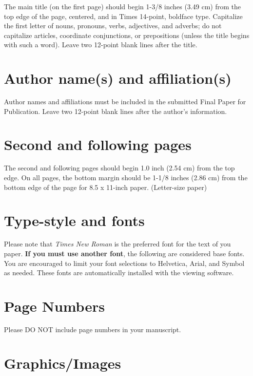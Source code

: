 \documentclass[10pt]{article}
\begin{document}
The main title (on the first page) should begin 1-3/8 inches (3.49 cm) from the top edge of the page, centered, and in Times 14-point, boldface type. Capitalize the first letter of nouns, pronouns, verbs, adjectives, and adverbs; do not capitalize articles, coordinate conjunctions, or prepositions (unless the title begins with such a word). Leave two 12-point blank lines after the title.

\section{Author name(s) and affiliation(s) }

Author names and affiliations must be included in the submitted Final Paper for Publication. Leave two 12-point blank lines after the author’s information. 

\section{Second and following pages}
\label{sect:pdf}

The second and following pages should begin 1.0 inch (2.54 cm) from the top edge. On all pages, the bottom margin should be 1-1/8 inches (2.86 cm) from the bottom edge of the page for 8.5 x 11-inch paper. (Letter-size paper)

\section{Type-style and fonts}
\label{sec:type-style}

Please note that {\em Times New Roman} is the preferred font for the text of you paper. \textbf{If you must use another font}, the following are considered base fonts.  You are encouraged to limit your font selections to Helvetica, Arial, and Symbol as needed. These fonts are automatically installed with the viewing software. 

\section{Page Numbers}

Please DO NOT include page numbers in your manuscript.

 

\section{Graphics/Images}
\end{document}
